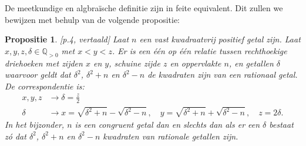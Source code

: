 \documentclass[12pt,reqno]{article}
\newcommand*{\QQ}{\ensuremath{\mathbb{Q}}}
\theoremstyle{theorem}
\newtheorem{proposition}[theorem]{Propositie}
\theoremstyle{definition}
\begin{document}
	De meetkundige en algbra\"ische definitie zijn in feite equivalent. Dit zullen we bewijzen met behulp van de volgende propositie:
	
	\begin{proposition}
		\cite{Koblitz}[p.4, vertaald] Laat $n$ een vast kwadraatvrij positief getal zijn. Laat $x,y,z,\delta \in\QQ_{>0}$ met $x<y<z$. Er is een \'e\'en op \'e\'en relatie tussen rechthoekige driehoeken met zijden $x$ en $y$, schuine zijde $z$ en oppervlakte $n$, en getallen $\delta$ waarvoor geldt dat $\delta^2$, $\delta^2 +n$ en $\delta^2 -n$ de kwadraten zijn van een rationaal getal. De correspondentie is:
		\begin{align}
			\label{prop:corr1} x,y,z &\rightarrow \delta = \frac{z}{2} \\
			\label{prop:corr2} \delta &\rightarrow x=\sqrt{\delta^2+n} - \sqrt{\delta^2-n},\quad y = \sqrt{\delta^2+n}+\sqrt{\delta^2-n},\quad z = 2\delta.
		\end{align}
		In het bijzonder, $n$ is een congruent getal dan en slechts dan als er een $\delta$ bestaat z\'o dat $\delta^2$, $\delta^2+n$ en $\delta^2-n$ kwadraten van rationale getallen zijn.
	\end{proposition}
\end{document}
